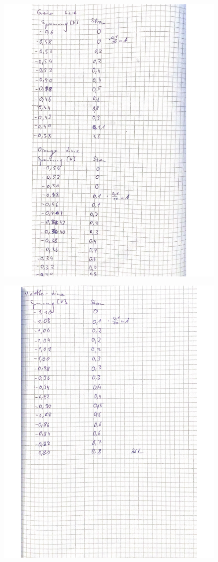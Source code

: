\begin{figure}[H]
  \centering
  \includegraphics[width=\textwidth]{content/Bilder/IMG_3215.jpeg}
  \label{fig:Messungen_3}
\end{figure}
\begin{figure}[H]
    \centering
    \includegraphics[width=\textwidth]{content/Bilder/IMG_3216.jpeg}
    \label{fig:Messungen_4}
  \end{figure}